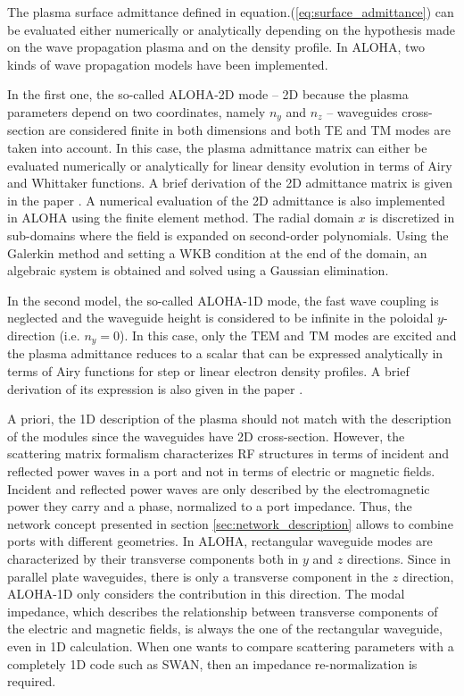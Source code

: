 The plasma surface admittance defined in equation.(\ref{eq:surface_admittance}) can be evaluated either numerically or analytically depending on the hypothesis made on the wave propagation plasma and on the density
profile\cite{brambilla1979, bers1983}. In ALOHA, two kinds of wave propagation models have been implemented. 

In the first one, the so-called ALOHA-2D mode -- 2D because the plasma parameters depend on two coordinates, namely $n_{y}$ and $n_{z}$ -- waveguides cross-section are considered finite in both dimensions and both TE and TM modes are taken into account. In this case, the plasma admittance matrix can either be evaluated numerically \cite{irzak1995} or analytically for linear density evolution in terms of Airy and Whittaker functions\cite{brambilla1979, bers1983}. A brief derivation of the 2D admittance matrix is given in the paper . A numerical evaluation of the 2D admittance is also implemented in ALOHA using the finite element method. The radial domain $x$ is discretized in sub-domains where the field is expanded on second-order polynomials. Using the Galerkin method and setting a WKB condition at the end of the domain, an algebraic system is obtained and solved using a Gaussian elimination. 

In the second model, the so-called ALOHA-1D mode, the fast wave coupling is neglected and the waveguide height is considered to be infinite in the poloidal $y$-direction (i.e. $n_{y}=0$). In this case, only the $\mbox{TEM}$ and ${\mathrm{TM}}$ modes are excited and the plasma admittance reduces to a scalar that can be expressed analytically in terms of Airy functions for step or linear electron density profiles\cite{brambilla1976-1}. A brief derivation of its expression is also given in the paper .

A priori, the 1D description of the plasma should not match with the description of the modules since the waveguides have 2D cross-section. However, the scattering matrix formalism characterizes RF structures in terms of incident and reflected power waves in a port and not in terms of electric or magnetic fields. Incident and reflected power waves are only described by the electromagnetic power they carry and a phase, normalized to a port impedance\cite{kurokawa1965}. Thus, the network concept presented in section \ref{sec:network_description} allows to combine ports with different geometries. In ALOHA, rectangular waveguide modes are characterized by their transverse components both in $y$ and $z$ directions. Since in parallel plate waveguides, there is only a transverse component in the $z$ direction, ALOHA-1D only considers the contribution in this direction. The modal impedance, which describes the relationship between transverse components of the electric and magnetic fields, is always the one of the rectangular waveguide, even in 1D calculation. When one wants to compare scattering parameters with a completely 1D code such as SWAN, then an impedance
re-normalization is required.

